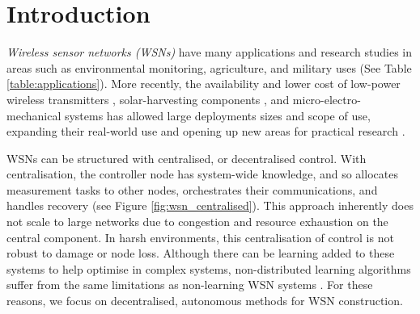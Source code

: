 \section{Introduction}

\ifdefined\DEBUG {} \else \fi
\textit{Wireless sensor networks (WSNs)} have many applications and research studies in areas such as environmental monitoring, agriculture, and military uses (See Table \ref{table:applications}). More recently, the availability and lower cost of low-power wireless transmitters \citep{902661}, solar-harvesting components \citep{Prauzek2018}, and micro-electro-mechanical systems \citep{1045391} has allowed large deployments sizes and scope of use, expanding their real-world use and opening up new areas for practical research \citep{5597912, Kandris2020}.

\ifdefined\DEBUG {} \else \fi
\ifdefined\DEBUG {} \else \fi
WSNs can be structured with centralised, or decentralised control. With centralisation, the controller node has system-wide knowledge, and so allocates measurement tasks to other nodes, orchestrates their communications, and handles recovery (see Figure \ref{fig:wsn_centralised}). This approach inherently does not scale to large networks due to congestion and resource exhaustion on the central component. In harsh environments, this centralisation of control is not robust to damage or node loss. Although there can be learning added to these systems to help optimise in complex systems, non-distributed learning algorithms suffer from the same limitations as non-learning WSN systems \citep{Imagestate2006}. For these reasons, we focus on decentralised, autonomous methods for WSN construction.


